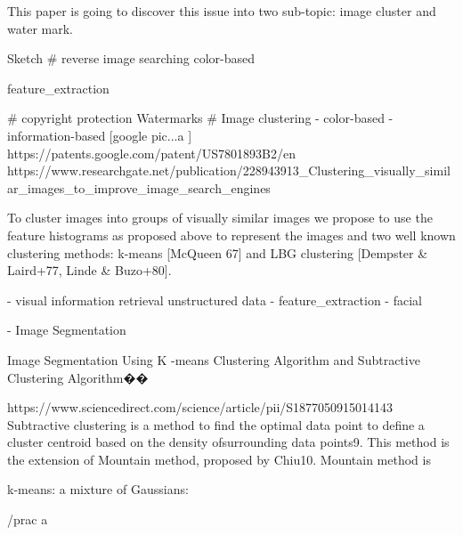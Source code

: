 This paper is going to discover this issue into two sub-topic: image cluster and water mark.

Sketch
# reverse image searching
    color-based

    feature_extraction   

# copyright protection
    Watermarks  
# Image clustering
    - color-based
    - information-based [google pic...a ]
    https://patents.google.com/patent/US7801893B2/en  
    https://www.researchgate.net/publication/228943913_Clustering_visually_similar_images_to_improve_image_search_engines  {

To cluster images into groups of visually similar images we propose to use the feature histograms as proposed above to represent the images and two well known clustering methods: k-means [McQueen 67] and LBG clustering [Dempster & Laird+77, Linde & Buzo+80]. 
    }
        - visual information retrieval
         unstructured data
        - feature_extraction   
        - facial 

        - Image Segmentation  

Image Segmentation Using K -means Clustering Algorithm and Subtractive Clustering Algorithm��{
https://www.sciencedirect.com/science/article/pii/S1877050915014143
Subtractive clustering is a method to find the optimal data point to define a cluster centroid based on the density ofsurrounding data points9. This method is the extension of Mountain method, proposed by Chiu10. Mountain method is

}

k-means: 
a mixture of Gaussians: 


/prac a

